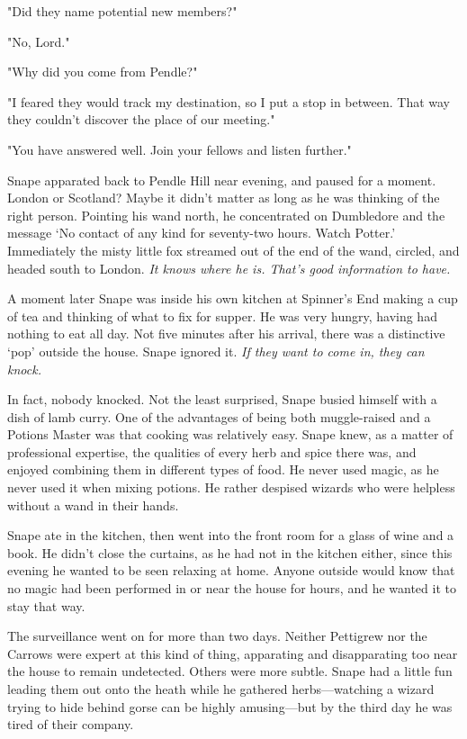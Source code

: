 "Did they name potential new members?"

"No, Lord."

"Why did you come from Pendle?"

"I feared they would track my destination, so I put a stop in between. That way they couldn't discover the place of our meeting."

"You have answered well. Join your fellows and listen further."

Snape apparated back to Pendle Hill near evening, and paused for a moment. London or Scotland? Maybe it didn't matter as long as he was thinking of the right person. Pointing his wand north, he concentrated on Dumbledore and the message `No contact of any kind for seventy-two hours. Watch Potter.' Immediately the misty little fox streamed out of the end of the wand, circled, and headed south to London. \emph{It knows where he is. That's good information to have.}

A moment later Snape was inside his own kitchen at Spinner's End making a cup of tea and thinking of what to fix for supper. He was very hungry, having had nothing to eat all day. Not five minutes after his arrival, there was a distinctive `pop' outside the house. Snape ignored it. \emph{If they want to come in, they can knock.}

In fact, nobody knocked. Not the least surprised, Snape busied himself with a dish of lamb curry. One of the advantages of being both muggle-raised and a Potions Master was that cooking was relatively easy. Snape knew, as a matter of professional expertise, the qualities of every herb and spice there was, and enjoyed combining them in different types of food. He never used magic, as he never used it when mixing potions. He rather despised wizards who were helpless without a wand in their hands.

Snape ate in the kitchen, then went into the front room for a glass of wine and a book. He didn't close the curtains, as he had not in the kitchen either, since this evening he wanted to be seen relaxing at home. Anyone outside would know that no magic had been performed in or near the house for hours, and he wanted it to stay that way.

The surveillance went on for more than two days. Neither Pettigrew nor the Carrows were expert at this kind of thing, apparating and disapparating too near the house to remain undetected. Others were more subtle. Snape had a little fun leading them out onto the heath while he gathered herbs—watching a wizard trying to hide behind gorse can be highly amusing—but by the third day he was tired of their company.

